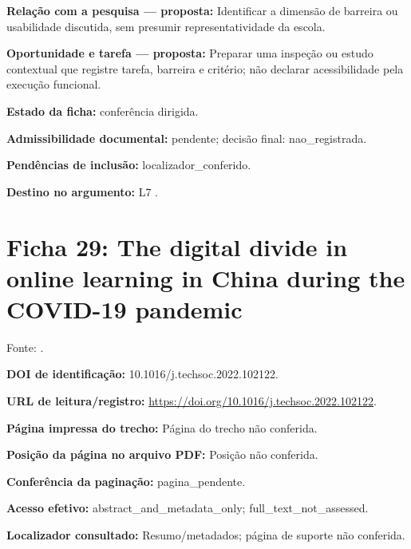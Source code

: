 \noindent\textbf{Relação com a pesquisa — proposta:} Identificar a dimensão de barreira ou usabilidade discutida, sem presumir representatividade da escola.\par\medskip

\noindent\textbf{Oportunidade e tarefa — proposta:} Preparar uma inspeção ou estudo contextual que registre tarefa, barreira e critério; não declarar acessibilidade pela execução funcional.\par\medskip

\noindent\textbf{Estado da ficha:} conferência dirigida.\par\medskip

\noindent\textbf{Admissibilidade documental:} pendente; decisão final: nao\_registrada.\par\medskip

\noindent\textbf{Pendências de inclusão:} localizador\_conferido.\par\medskip

\noindent\textbf{Destino no argumento:} L7 .

\clearpage\section*{Ficha 29: The digital divide in online learning in China during the COVID-19 pandemic}

Fonte: \citet{guo2022}.

\noindent\textbf{DOI de identificação:} 10.1016/j.techsoc.2022.102122.\par\medskip

\noindent\textbf{URL de leitura/registro:} \url{https://doi.org/10.1016/j.techsoc.2022.102122}.\par\medskip

\noindent\textbf{Página impressa do trecho:} Página do trecho não conferida.\par\medskip

\noindent\textbf{Posição da página no arquivo PDF:} Posição não conferida.\par\medskip

\noindent\textbf{Conferência da paginação:} pagina\_pendente.\par\medskip

\noindent\textbf{Acesso efetivo:} abstract\_and\_metadata\_only; full\_text\_not\_assessed.\par\medskip

\noindent\textbf{Localizador consultado:} Resumo/metadados; página de suporte não conferida.\par\medskip

